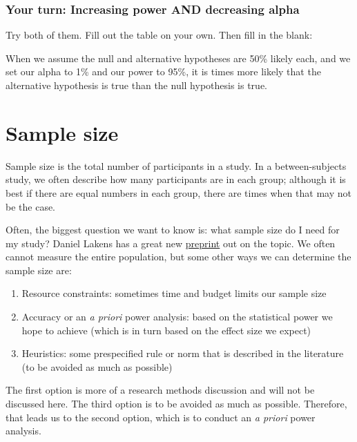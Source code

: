 \documentclass[
]{book}
\providecommand{\tightlist}{%
  \setlength{\itemsep}{0pt}\setlength{\parskip}{0pt}}
\begin{document}
\hypertarget{your-turn-increasing-power-and-decreasing-alpha}{%
\subsubsection{Your turn: Increasing power AND decreasing alpha}\label{your-turn-increasing-power-and-decreasing-alpha}}

Try both of them. Fill out the table on your own. Then fill in the blank:

When we assume the null and alternative hypotheses are 50\% likely each, and we set our alpha to 1\% and our power to 95\%, it is times more likely that the alternative hypothesis is true than the null hypothesis is true.

\hypertarget{sample-size}{%
\section{Sample size}\label{sample-size}}

Sample size is the total number of participants in a study. In a between-subjects study, we often describe how many participants are in each group; although it is best if there are equal numbers in each group, there are times when that may not be the case.

Often, the biggest question we want to know is: what sample size do I need for my study? Daniel Lakens has a great new \href{https://psyarxiv.com/9d3yf/}{preprint} out on the topic. We often cannot measure the entire population, but some other ways we can determine the sample size are:

\begin{enumerate}
\def\labelenumi{\arabic{enumi}.}
\tightlist
\item
  Resource constraints: sometimes time and budget limits our sample size
\item
  Accuracy or an \emph{a priori} power analysis: based on the statistical power we hope to achieve (which is in turn based on the effect size we expect)
\item
  Heuristics: some prespecified rule or norm that is described in the literature (to be avoided as much as possible)
\end{enumerate}

The first option is more of a research methods discussion and will not be discussed here. The third option is to be avoided as much as possible. Therefore, that leads us to the second option, which is to conduct an \emph{a priori} power analysis.
\end{document}
